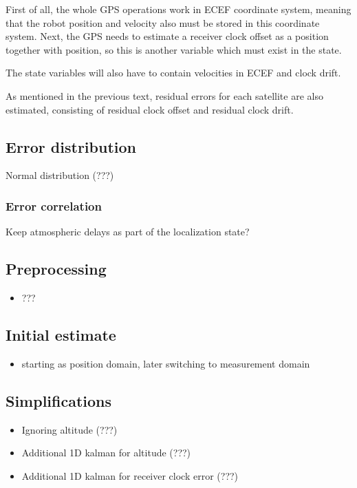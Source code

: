 First of all, the whole GPS operations work in ECEF coordinate system, meaning
that the robot position and velocity also must be stored in this coordinate system.
Next, the GPS needs to estimate a receiver clock offset as a position together
with position, so this is another variable which must exist in the state.

The state variables will also have to contain velocities in ECEF and clock drift.

As mentioned in the previous text, residual errors for each satellite are also
estimated, consisting of residual clock offset and residual clock drift.

\subsection{Error distribution}
Normal distribution (???)

\subsubsection{Error correlation}
\label{sec:measurement-domain-correlation}
Keep atmospheric delays as part of the localization state?

\subsection{Preprocessing}
\begin{itemize}
\item ???
\end{itemize}

\subsection{Initial estimate}
\begin{itemize}
\item starting as position domain, later switching to measurement domain
\end{itemize}

\subsection{Simplifications}
\begin{itemize}
\item Ignoring altitude (???)
\item Additional 1D kalman for altitude (???)
\item Additional 1D kalman for receiver clock error (???)
\end{itemize}
